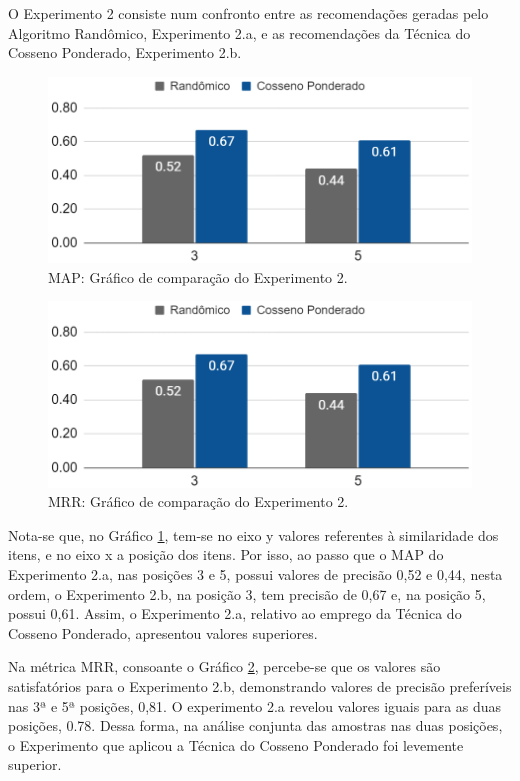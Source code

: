 \documentclass[portuguese]{textolivre}
\begin{document}
O Experimento 2 consiste num confronto entre as recomendações geradas pelo Algoritmo Randômico, Experimento 2.a, e as recomendações da Técnica do Cosseno Ponderado, Experimento 2.b.

\begin{figure}[H]
	\centering
	\includegraphics[scale=0.75]{imagens/fig-023.png}
	\caption{MAP: Gráfico de comparação do Experimento 2.}
	\label{fig:020}
\end{figure}


\begin{figure}[H]
	\centering
	\includegraphics[scale=0.75]{imagens/fig-023.png}
	\caption{MRR: Gráfico de comparação do Experimento 2.}
	\label{fig:021}
\end{figure} 

Nota-se que, no Gráfico \ref{fig:020}, tem-se no eixo y valores referentes à similaridade dos itens, e no eixo x a posição dos itens. Por isso, ao passo que o MAP do Experimento 2.a, nas posições 3 e 5, possui valores de precisão 0,52 e 0,44, nesta ordem, o Experimento 2.b, na posição 3, tem precisão de 0,67 e, na posição 5, possui 0,61. Assim, o Experimento 2.a, relativo ao emprego da Técnica do Cosseno Ponderado, apresentou valores superiores.

Na métrica MRR, consoante o Gráfico \ref{fig:021}, percebe-se que os valores são satisfatórios para o Experimento 2.b, demonstrando valores de precisão preferíveis nas 3ª e 5ª posições, 0,81. O experimento 2.a revelou valores iguais para as duas posições, 0.78. Dessa forma, na análise conjunta das amostras nas duas posições, o Experimento que aplicou a Técnica do Cosseno Ponderado foi levemente superior.
\end{document}
